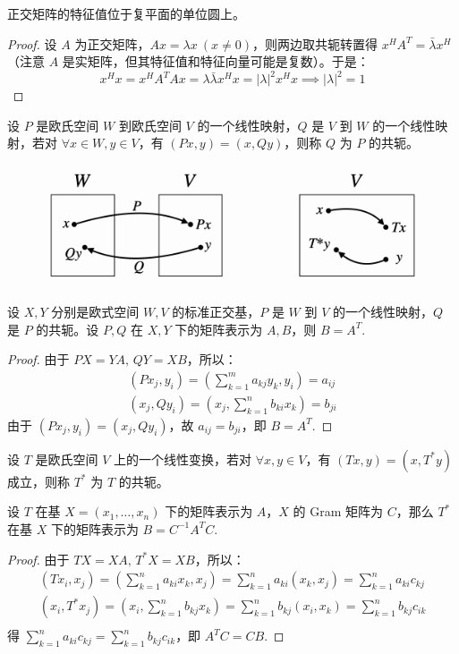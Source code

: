 \begin{property}
正交矩阵的特征值位于复平面的单位圆上。
\end{property}
\begin{proof}
设 $A$ 为正交矩阵，$Ax=\lambda x\ (x\neq 0)$，则两边取共轭转置得 $x^HA^T=\bar\lambda x^H$（注意 $A$ 是实矩阵，但其特征值和特征向量可能是复数）。于是：
\[
    x^Hx=x^HA^TAx=\lambda\bar\lambda x^Hx=|\lambda|^2x^Hx\implies |\lambda|^2=1
\]
\end{proof}

\begin{definition}[线性映射的共轭]
设 $P$ 是欧氏空间 $W$ 到欧氏空间 $V$ 的一个线性映射，$Q$ 是 $V$ 到 $W$ 的一个线性映射，若对 $\forall x\in W,y\in V$，有 $(Px,y)=(x,Qy)$，则称 $Q$ 为 $P$ 的共轭。
\end{definition}

\begin{figure}[H]
    \centering
    \includegraphics[width=0.5\linewidth]{figs/conj.png}
\end{figure}

\begin{theorem}
设 $X,Y$ 分别是欧式空间 $W,V$ 的标准正交基，$P$ 是 $W$ 到 $V$ 的一个线性映射，$Q$ 是 $P$ 的共轭。设 $P,Q$ 在 $X,Y$ 下的矩阵表示为 $A,B$，则 $B=A^T$.
\end{theorem}
\begin{proof}
由于 $PX=YA,\,QY=XB$，所以：
\begin{gather*}
    (Px_j,y_i)=\left(\sum_{k=1}^m a_{kj}y_k,y_i\right)=a_{ij}\\
    (x_j,Qy_i)=\left(x_j,\sum_{k=1}^nb_{ki}x_k\right)=b_{ji}
\end{gather*}
由于 $(Px_j,y_i)=(x_j,Qy_i)$，故 $a_{ij}=b_{ji}$，即 $B=A^T$.
\end{proof}

\begin{definition}[线性变换的共轭]
设 $T$ 是欧氏空间 $V$ 上的一个线性变换，若对 $\forall x,y\in V$，有 $(Tx,y)=(x,T^\ast y)$ 成立，则称 $T^\ast$ 为 $T$ 的共轭。
\end{definition}

\begin{theorem}
\label{thm:conjgram}
设 $T$ 在基 $X=(x_1,\ldots,x_n)$ 下的矩阵表示为 $A$，$X$ 的 Gram 矩阵为 $C$，那么 $T^\ast$ 在基 $X$ 下的矩阵表示为 $B=C^{-1}A^TC$.
\end{theorem}
\begin{proof}
由于 $TX=XA,\,T^\ast X=XB$，所以：
\begin{gather*}
    (Tx_i,x_j)=\left(\sum_{k=1}^na_{ki}x_k,x_j\right)=\sum_{k=1}^na_{ki}(x_k,x_j)=\sum_{k=1}^na_{ki}c_{kj}\\
    (x_i,T^\ast x_j)=\left(x_i,\sum_{k=1}^nb_{kj}x_k\right)=\sum_{k=1}^nb_{kj}(x_i,x_k)=\sum_{k=1}^nb_{kj}c_{ik}\\
\end{gather*}
得 $\sum_{k=1}^na_{ki}c_{kj}=\sum_{k=1}^n b_{kj}c_{ik}$，即 $A^TC=CB$.
\end{proof}

